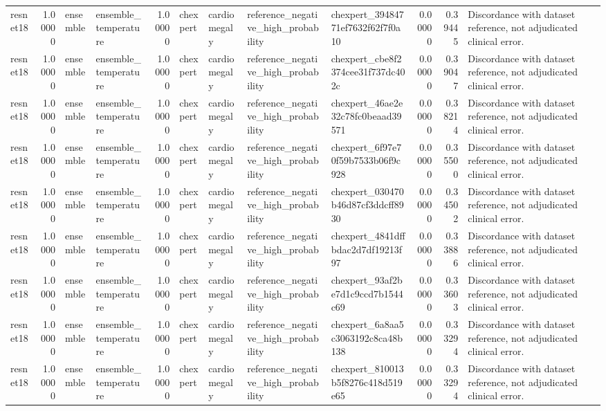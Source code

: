 \begin{tabular}{lrllrllllrrl}
resnet18 & 1.00000 & ensemble & ensemble\_temperature & 1.00000 & chexpert & cardiomegaly & reference\_negative\_high\_probability & chexpert\_39484771ef7632f62f7f0a10 & 0.00000 & 0.39445 & Discordance with dataset reference, not adjudicated clinical error. \\
resnet18 & 1.00000 & ensemble & ensemble\_temperature & 1.00000 & chexpert & cardiomegaly & reference\_negative\_high\_probability & chexpert\_cbe8f2374cee31f737dc402c & 0.00000 & 0.39047 & Discordance with dataset reference, not adjudicated clinical error. \\
resnet18 & 1.00000 & ensemble & ensemble\_temperature & 1.00000 & chexpert & cardiomegaly & reference\_negative\_high\_probability & chexpert\_46ae2e32c78fc0beaad39571 & 0.00000 & 0.38214 & Discordance with dataset reference, not adjudicated clinical error. \\
resnet18 & 1.00000 & ensemble & ensemble\_temperature & 1.00000 & chexpert & cardiomegaly & reference\_negative\_high\_probability & chexpert\_6f97e70f59b7533b06f9c928 & 0.00000 & 0.35500 & Discordance with dataset reference, not adjudicated clinical error. \\
resnet18 & 1.00000 & ensemble & ensemble\_temperature & 1.00000 & chexpert & cardiomegaly & reference\_negative\_high\_probability & chexpert\_030470b46d87cf3ddcff8930 & 0.00000 & 0.34502 & Discordance with dataset reference, not adjudicated clinical error. \\
resnet18 & 1.00000 & ensemble & ensemble\_temperature & 1.00000 & chexpert & cardiomegaly & reference\_negative\_high\_probability & chexpert\_4841dffbdac2d7df19213f97 & 0.00000 & 0.33886 & Discordance with dataset reference, not adjudicated clinical error. \\
resnet18 & 1.00000 & ensemble & ensemble\_temperature & 1.00000 & chexpert & cardiomegaly & reference\_negative\_high\_probability & chexpert\_93af2be7d1c9ccd7b1544c69 & 0.00000 & 0.33603 & Discordance with dataset reference, not adjudicated clinical error. \\
resnet18 & 1.00000 & ensemble & ensemble\_temperature & 1.00000 & chexpert & cardiomegaly & reference\_negative\_high\_probability & chexpert\_6a8aa5c3063192c8ca48b138 & 0.00000 & 0.33294 & Discordance with dataset reference, not adjudicated clinical error. \\
resnet18 & 1.00000 & ensemble & ensemble\_temperature & 1.00000 & chexpert & cardiomegaly & reference\_negative\_high\_probability & chexpert\_810013b5f8276c418d519e65 & 0.00000 & 0.33294 & Discordance with dataset reference, not adjudicated clinical error. \\

\end{tabular}
